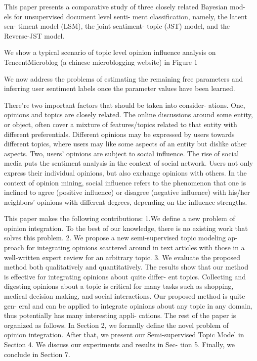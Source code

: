 \documentclass[runningheads,a4paper]{llncs}
\begin{document}
This paper presents a comparative study of three closely related Bayesian mod- els for unsupervised document level senti- ment classification, namely, the latent sen- timent model (LSM), the joint sentiment- topic (JST) model, and the Reverse-JST model.\cite{lin2010comparative}

We show a typical scenario of topic level opinion influence analysis on TencentMicroblog (a chinese microblogging website) in Figure 1


We now address the problems of estimating the remaining free parameters and inferring user sentiment labels once the parameter values have been learned.

There’re two important factors that should be taken into consider- ations. One, opinions and topics are closely related. The online discussions around some entity, or object, often cover a mixture of features/topics related to that entity with different preferentials. Different opinions may be expressed by users towards different topics, where users may like some aspects of an entity but dislike other aspects. Two, users’ opinions are subject to social influence. The rise of social media puts the sentiment analysis in the context of social network. Users not only express their individual opinions, but also exchange opinions with others. In the context of opinion mining, social influence refers to the phenomenon that one is inclined to agree (positive influence) or disagree (negative influence) with his/her neighbors’ opinions with different degrees, depending on the influence strengths.


This paper makes the following contributions:
1.We define a new problem of opinion integration. To the best of our knowledge, there is no existing work that solves this problem.
2. We propose a new semi-supervised topic modeling ap- proach for integrating opinions scattered around in text articles with those in a well-written expert review for an arbitrary topic.
3. We evaluate the proposed method both qualitatively and quantitatively. The results show that our method is effective for integrating opinions about quite differ- ent topics.
Collecting and digesting opinions about a topic is critical for many tasks such as shopping, medical decision making, and social interactions. Our proposed method is quite gen- eral and can be applied to integrate opinions about any topic in any domain, thus potentially has many interesting appli- cations. The rest of the paper is organized as follows. In Section 2,
we formally define the novel problem of opinion integration. After that, we present our Semi-supervised Topic Model in Section 4. We discuss our experiments and results in Sec- tion 5. Finally, we conclude in Section 7.
\end{document}
